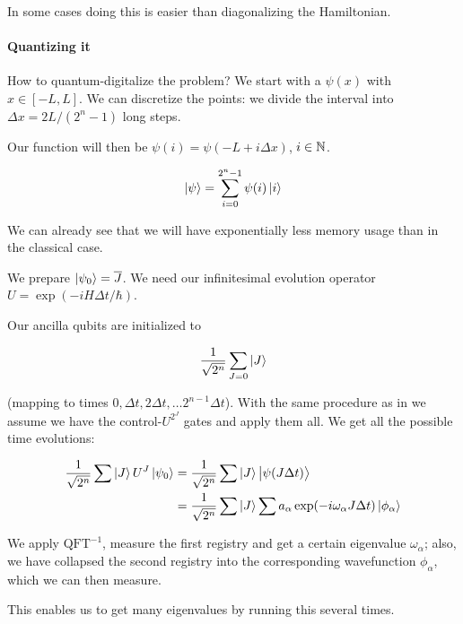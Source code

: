 \documentclass[main.tex]{subfiles}
\begin{document}
In some cases doing this is easier than diagonalizing the Hamiltonian.

\paragraph{Quantizing it}

How to quantum-digitalize the problem? We start  with a \(\psi(x)\) with \(x \in [-L, L]\). We can discretize the points: we divide the interval into \(\Delta x = 2L / (2^n -1)\) long steps.

Our function will then be \(\psi(i) = \psi(-L + i \Delta x)\), \(i \in \mathbb{N}\).

\begin{equation}
  \ket{\psi} = \sum _{i=0}   ^{2^n-1} \psi(i) \ket{i}
\end{equation}

We can already see that we will have exponentially less memory usage than in the classical case.

We prepare \(\ket{\psi_{0}} = \overline{J} \). We need our infinitesimal evolution operator \(U = \exp(-i H \Delta t / \hbar) \).

Our ancilla qubits are initialized to

\begin{equation}
  \frac{1}{\sqrt{2^n}} \sum _{J=0}^{}  \ket{J}
\end{equation}

(mapping to times \(0, \Delta t, 2\Delta t, \dots 2^{n-1}\Delta t\)). With the same procedure as in  we assume we have the control-\(U^{2^J}\) gates and apply them all. We get all the possible time evolutions:

\begin{subequations}
\begin{align}
  \frac{1}{\sqrt{2^n}} \sum \ket{J} U^J \ket{\psi_0}
  &= \frac{1}{\sqrt{2^n}} \sum  \ket{J} \ket{\psi (J\Delta t)}  \\
  &= \frac{1}{\sqrt{2^n}} \sum  \ket{J} \sum a_\alpha \exp(-i \omega_\alpha J \Delta t) \ket{\phi_\alpha}
\end{align}
\end{subequations}

We apply \( \text{QFT}^{-1}\), measure the first registry and get a certain eigenvalue \(\omega_\alpha\); also, we have collapsed the second registry into the corresponding wavefunction \(\phi_\alpha\), which we can then measure.

This enables us to get many eigenvalues by running this several times.
\end{document}
